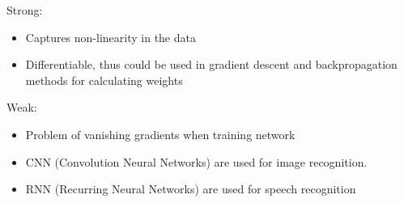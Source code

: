 \documentclass{article}
\begin{document}

Strong:
\begin{itemize}
    \item Captures non-linearity in the data
    \item Differentiable, thus could be used in gradient descent and backpropagation methods for calculating weights
\end{itemize}

Weak:
\begin{itemize}
    \item Problem of vanishing gradients when training network
\end{itemize}




\begin{itemize}
    \item CNN (Convolution Neural Networks) are used for image recognition.
    \item RNN (Recurring Neural Networks) are used for speech recognition
\end{itemize}

\end{document}
